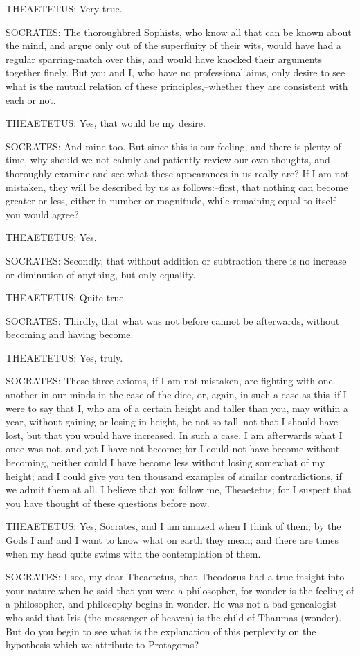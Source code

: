 THEAETETUS: Very true.

SOCRATES: The thoroughbred Sophists, who know all that can be known
about the mind, and argue only out of the superfluity of their wits,
would have had a regular sparring-match over this, and would have
knocked their arguments together finely. But you and I, who have no
professional aims, only desire to see what is the mutual relation of
these principles,--whether they are consistent with each or not.

THEAETETUS: Yes, that would be my desire.

SOCRATES: And mine too. But since this is our feeling, and there is
plenty of time, why should we not calmly and patiently review our own
thoughts, and thoroughly examine and see what these appearances in
us really are? If I am not mistaken, they will be described by us as
follows:--first, that nothing can become greater or less, either in
number or magnitude, while remaining equal to itself--you would agree?

THEAETETUS: Yes.

SOCRATES: Secondly, that without addition or subtraction there is no
increase or diminution of anything, but only equality.

THEAETETUS: Quite true.

SOCRATES: Thirdly, that what was not before cannot be afterwards,
without becoming and having become.

THEAETETUS: Yes, truly.

SOCRATES: These three axioms, if I am not mistaken, are fighting with
one another in our minds in the case of the dice, or, again, in such a
case as this--if I were to say that I, who am of a certain height and
taller than you, may within a year, without gaining or losing in height,
be not so tall--not that I should have lost, but that you would have
increased. In such a case, I am afterwards what I once was not, and yet
I have not become; for I could not have become without becoming, neither
could I have become less without losing somewhat of my height; and I
could give you ten thousand examples of similar contradictions, if
we admit them at all. I believe that you follow me, Theaetetus; for I
suspect that you have thought of these questions before now.

THEAETETUS: Yes, Socrates, and I am amazed when I think of them; by the
Gods I am! and I want to know what on earth they mean; and there are
times when my head quite swims with the contemplation of them.

SOCRATES: I see, my dear Theaetetus, that Theodorus had a true insight
into your nature when he said that you were a philosopher, for wonder
is the feeling of a philosopher, and philosophy begins in wonder. He was
not a bad genealogist who said that Iris (the messenger of heaven)
is the child of Thaumas (wonder). But do you begin to see what is the
explanation of this perplexity on the hypothesis which we attribute to
Protagoras?

